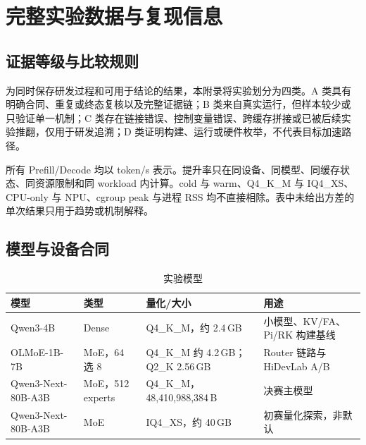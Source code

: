 \section{完整实验数据与复现信息}
\label{sec:appendix-results}

\subsection{证据等级与比较规则}

为同时保存研发过程和可用于结论的结果，本附录将实验划分为四类。A 类具有明确合同、重复或终态复核以及完整证据链；B 类来自真实运行，但样本较少或只验证单一机制；C 类存在链接错误、控制变量错误、跨缓存拼接或已被后续实验推翻，仅用于研发追溯；D 类证明构建、运行或硬件枚举，不代表目标加速路径。

所有 Prefill/Decode 均以 token/s 表示。提升率只在同设备、同模型、同缓存状态、同资源限制和同 workload 内计算。cold 与 warm、Q4\_K\_M 与 IQ4\_XS、CPU-only 与 NPU、cgroup peak 与进程 RSS 均不直接相除。表中未给出方差的单次结果只用于趋势或机制解释。

\subsection{模型与设备合同}

\begin{table}[H]
  \centering
  \scriptsize
  \caption{实验模型}
  \label{tab:appendix-models}
  \begin{tabular}{p{}p{}p{}p{}}
    \toprule
    模型 & 类型 & 量化/大小 & 用途 \\
    \midrule
    Qwen3-4B & Dense & Q4\_K\_M，约 2.4\,GB & 小模型、KV/FA、Pi/RK 构建基线 \\
    OLMoE-1B-7B & MoE，64 选 8 & Q4\_K\_M 约 4.2\,GB；Q2\_K 2.56\,GB & Router 链路与 HiDevLab A/B \\
    Qwen3-Next-80B-A3B & MoE，512 experts & Q4\_K\_M，48,410,988,384\,B & 决赛主模型 \\
    Qwen3-Next-80B-A3B & MoE & IQ4\_XS，约 40\,GB & 初赛量化探索，非默认 \\
    \bottomrule
  \end{tabular}
\end{table}

